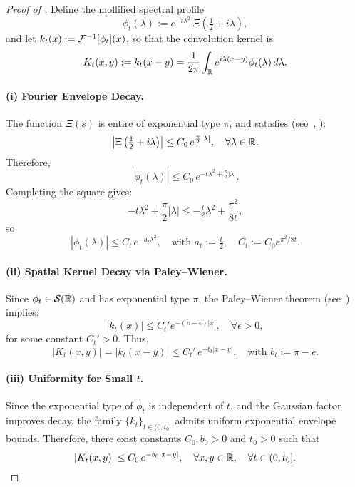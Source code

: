\begin{proof}[Proof of ]
Define the mollified spectral profile
\[
\phi_t(\lambda) := e^{-t\lambda^2} \, \Xi\left(\tfrac{1}{2} + i\lambda\right),
\]
and let \( k_t(x) := \mathcal{F}^{-1}[\phi_t](x) \), so that the convolution kernel is
\[
K_t(x,y) := k_t(x - y) = \frac{1}{2\pi} \int_{\mathbb{R}} e^{i\lambda(x - y)} \phi_t(\lambda)\, d\lambda.
\]

\paragraph{(i) Fourier Envelope Decay.}
The function \( \Xi(s) \) is entire of exponential type \( \pi \), and satisfies (see~\cite[Thm.~3.7.1]{Levin1996EntireLectures}, \cite[§4.12]{Titchmarsh1986Zeta}):
\[
\left| \Xi\left( \tfrac{1}{2} + i\lambda \right) \right| \le C_0\, e^{\frac{\pi}{2} |\lambda|}, \quad \forall \lambda \in \mathbb{R}.
\]
Therefore,
\[
|\phi_t(\lambda)| \le C_0\, e^{-t\lambda^2 + \frac{\pi}{2}|\lambda|}.
\]
Completing the square gives:
\[
-t\lambda^2 + \frac{\pi}{2}|\lambda| \le -\tfrac{t}{2} \lambda^2 + \frac{\pi^2}{8t},
\]
so
\[
|\phi_t(\lambda)| \le C_t\, e^{-a_t \lambda^2}, \quad \text{with } a_t := \tfrac{t}{2}, \quad C_t := C_0 e^{\pi^2/8t}.
\]

\paragraph{(ii) Spatial Kernel Decay via Paley--Wiener.}
Since \( \phi_t \in \mathcal{S}(\mathbb{R}) \) and has exponential type \( \pi \), the Paley--Wiener theorem (see~\cite[Ch.~IX.4]{ReedSimon1975II}) implies:
\[
|k_t(x)| \le C_t' e^{-(\pi - \epsilon)|x|}, \quad \forall \epsilon > 0,
\]
for some constant \( C_t' > 0 \). Thus,
\[
|K_t(x,y)| = |k_t(x - y)| \le C_t'\, e^{-b_t |x - y|}, \quad \text{with } b_t := \pi - \epsilon.
\]

\paragraph{(iii) Uniformity for Small \( t \).}
Since the exponential type of \( \phi_t \) is independent of \( t \), and the Gaussian factor improves decay, the family \( \{k_t\}_{t \in (0, t_0]} \) admits uniform exponential envelope bounds. Therefore, there exist constants \( C_0, b_0 > 0 \) and \( t_0 > 0 \) such that
\[
|K_t(x,y)| \le C_0\, e^{-b_0 |x - y|}, \quad \forall x, y \in \mathbb{R}, \quad \forall t \in (0, t_0].
\]


\end{proof}
